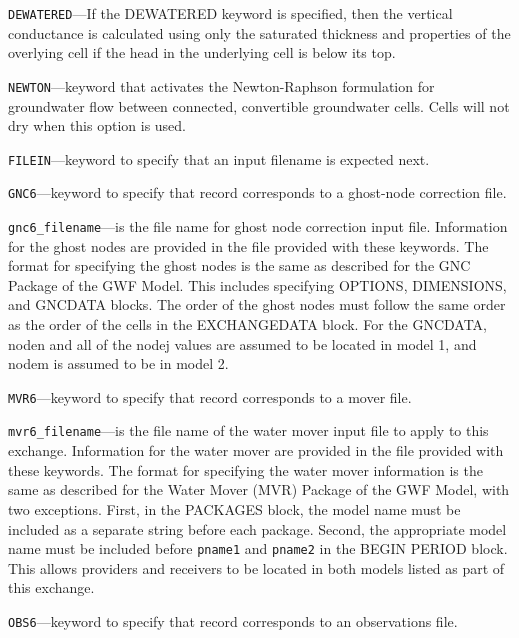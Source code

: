 \item \texttt{DEWATERED}---If the DEWATERED keyword is specified, then the vertical conductance is calculated using only the saturated thickness and properties of the overlying cell if the head in the underlying cell is below its top.

\item \texttt{NEWTON}---keyword that activates the Newton-Raphson formulation for groundwater flow between connected, convertible groundwater cells. Cells will not dry when this option is used.

\item \texttt{FILEIN}---keyword to specify that an input filename is expected next.

\item \texttt{GNC6}---keyword to specify that record corresponds to a ghost-node correction file.

\item \texttt{gnc6\_filename}---is the file name for ghost node correction input file.  Information for the ghost nodes are provided in the file provided with these keywords.  The format for specifying the ghost nodes is the same as described for the GNC Package of the GWF Model.  This includes specifying OPTIONS, DIMENSIONS, and GNCDATA blocks.  The order of the ghost nodes must follow the same order as the order of the cells in the EXCHANGEDATA block.  For the GNCDATA, noden and all of the nodej values are assumed to be located in model 1, and nodem is assumed to be in model 2.

\item \texttt{MVR6}---keyword to specify that record corresponds to a mover file.

\item \texttt{mvr6\_filename}---is the file name of the water mover input file to apply to this exchange.  Information for the water mover are provided in the file provided with these keywords.  The format for specifying the water mover information is the same as described for the Water Mover (MVR) Package of the GWF Model, with two exceptions.  First, in the PACKAGES block, the model name must be included as a separate string before each package.  Second, the appropriate model name must be included before \texttt{pname1} and \texttt{pname2} in the BEGIN PERIOD block.  This allows providers and receivers to be located in both models listed as part of this exchange.

\item \texttt{OBS6}---keyword to specify that record corresponds to an observations file.

